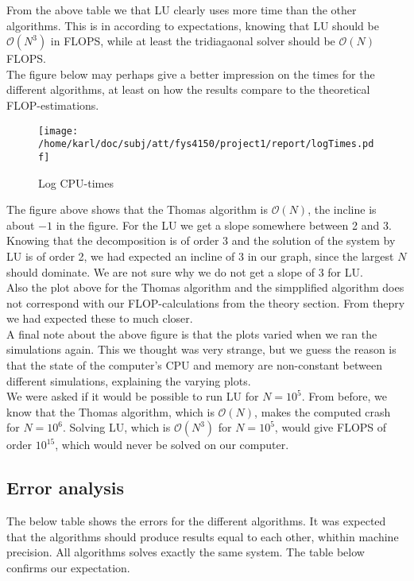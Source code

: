 \documentclass{article}
\begin{document}
From the above table we that LU clearly uses more time than the other algorithms. This is in according to expectations, knowing that LU should be $\mathcal{O}(N^3)$ in FLOPS, while at least the tridiagaonal solver should be $\mathcal{O}(N)$ FLOPS.\\

The figure below may perhaps give a better impression on the times for the different algorithms, at least on how the results compare to the theoretical FLOP-estimations.

\begin{figure}[H]
	\centering
	\texttt{[image: /home/karl/doc/subj/att/fys4150/project1/report/logTimes.pdf]}
	\caption{Log CPU-times}
	\label{fig:logtimes}
\end{figure}

The figure above shows that the Thomas algorithm is $\mathcal{O}(N)$, the incline is about $-1$ in the figure. For the LU we get a slope somewhere between 2 and 3. Knowing that the decomposition is of order 3 and the solution of the system by LU is of order 2, we had expected an incline of 3 in our graph, since the largest $N$ should dominate. We are not sure why we do not get a slope of 3 for LU. \\

Also the plot above for the Thomas algorithm and the simpplified algorithm does not correspond with our FLOP-calculations from the theory section. From thepry we had expected these to much closer.\\

A final note about the above figure is that the plots varied when we ran the simulations again. This we thought was very strange, but we guess the reason is that the state of the computer's CPU and memory are non-constant between different simulations, explaining the varying plots.\\

We were asked if it would be possible to run LU for $N=10^5.$ From before, we know that the Thomas algorithm, which is $\mathcal{O}(N)$, makes the computed crash for $N = 10^6$. Solving LU, which is $\mathcal{O}(N^3)$ for $N = 10^5$, would give FLOPS of order $10^15$, which would never be solved on our computer.

\subsection{Error analysis}
The below table shows the errors for the different algorithms. It was expected that the algorithms should produce results equal to each other, whithin machine precision. All algorithms solves exactly the same system. The table below confirms our expectation. 
\end{document}
